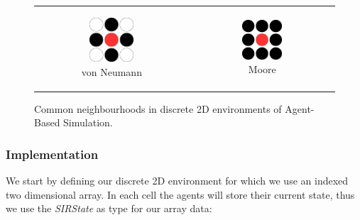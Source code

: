 \begin{figure}
\begin{center}
	\begin{tabular}{c c}
		\begin{subfigure}[b]{0.2\textwidth}
			\centering
			\includegraphics[width=0.5\textwidth, angle=0]{./fig/diagrams/neumann.png}
			\caption{von Neumann}
			\label{fig:neumann_neighbourhood}
		\end{subfigure}
    	&
		\begin{subfigure}[b]{0.2\textwidth}
			\centering
			\includegraphics[width=0.5\textwidth, angle=0]{./fig/diagrams/moore.png}
			\caption{Moore}
			\label{fig:moore_neighbourhood}
		\end{subfigure}
    \end{tabular}
	\caption{Common neighbourhoods in discrete 2D environments of Agent-Based Simulation.}
	\label{fig:abs_neighbourhoods}
\end{center}
\end{figure}

\subsubsection{Implementation}
We start by defining our discrete 2D environment for which we use an indexed two dimensional array. In each cell the agents will store their current state, thus we use the \textit{SIRState} as type for our array data:


